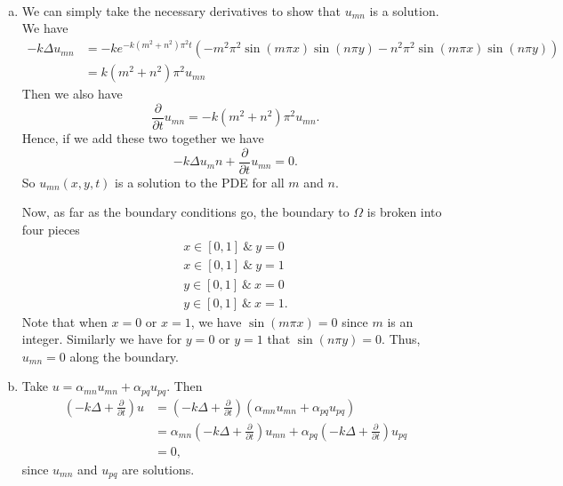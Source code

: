 \documentclass[12pt]{article} %
\begin{document}
\begin{solution}~
\begin{enumerate}[(a)]
    \item We can simply take the necessary derivatives to show that $u_{mn}$ is a solution.  We have
    \begin{align*}
    -k\Delta u_{mn} &= -ke^{-k(m^2+n^2)\pi^2 t} \left( -m^2\pi^2 \sin(m\pi x)\sin(n\pi y)-n^2\pi^2 \sin(m\pi x)\sin(n\pi y)\right) \\
    &=k(m^2+n^2)\pi^2 u_{mn}
    \end{align*}
    Then we also have
    \[
    \frac{\partial}{\partial t} u_{mn} = -k(m^2+n^2)\pi^2 u_{mn}.
    \]
    Hence, if we add these two together we have
    \[
    -k\Delta u_mn + \frac{\partial}{\partial t} u_{mn} = 0.
    \]
    So $u_{mn}(x,y,t)$ is a solution to the PDE for all $m$ and $n$.
    
    Now, as far as the boundary conditions go, the boundary to $\Omega$ is broken into four pieces
    \begin{align*}
    x\in [0,1] ~\& ~ y=0\\
    x\in [0,1] ~\& ~ y=1\\
    y\in [0,1] ~\& ~ x=0\\
    y \in [0,1] ~\& ~ x=1.
    \end{align*}
    Note that when $x=0$ or $x=1$, we have $\sin(m\pi x)=0$ since $m$ is an integer. Similarly we have for $y=0$ or $y=1$ that $\sin(n\pi y)=0$.  Thus, $u_{mn}=0$ along the boundary.
    
    \item Take $u=\alpha_{mn}u_{mn}+\alpha_{pq}u_{pq}$.  Then
    \begin{align*}
        \left( -k \Delta + \frac{\partial}{\partial t} \right) u &= \left( -k \Delta + \frac{\partial}{\partial t} \right)(\alpha_{mn}u_{mn} + \alpha_{pq} u_{pq} )\\
        &= \alpha_{mn} \left( -k \Delta + \frac{\partial}{\partial t} \right)u_{mn} + \alpha_{pq} \left( -k \Delta + \frac{\partial}{\partial t} \right) u_{pq}\\
        &=0,
    \end{align*}
    since $u_{mn}$ and $u_{pq}$ are solutions.
    

\end{enumerate}
\end{solution}
\end{document}
